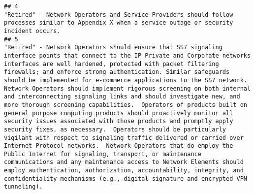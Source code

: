 \documentclass[
]{article}
\begin{document}
\begin{verbatim}
## 4                                                                                                                                                                                                                                                                                                                                                                                                                                                                                                                                                                                                                                                                                                                                                                                                                                                                                                                                                                                                                                                                                                                                                                                                                                                                                                                    "Retired" - Network Operators and Service Providers should follow processes similar to Appendix X when a service outage or security incident occurs.
## 5                                                                                                                                                                                                                                                                             "Retired" - Network Operators should ensure that SS7 signaling interface points that connect to the IP Private and Corporate networks interfaces are well hardened, protected with packet filtering firewalls; and enforce strong authentication. Similar safeguards should be implemented for e-commerce applications to the SS7 network. Network Operators should implement rigorous screening on both internal and interconnecting signaling links and should investigate new, and more thorough screening capabilities.  Operators of products built on general purpose computing products should proactively monitor all security issues associated with those products and promptly apply security fixes, as necessary.  Operators should be particularly vigilant with respect to signaling traffic delivered or carried over Internet Protocol networks.  Network Operators that do employ the Public Internet for signaling, transport, or maintenance communications and any maintenance access to Network Elements should employ authentication, authorization, accountability, integrity, and confidentiality mechanisms (e.g., digital signature and encrypted VPN tunneling).

\end{verbatim}
\end{document}
